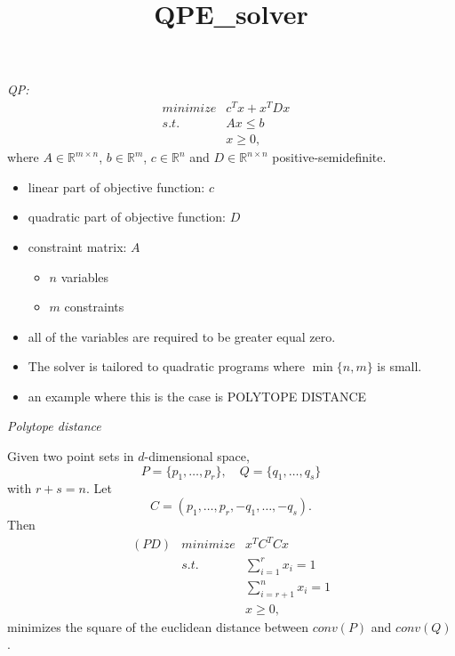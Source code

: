 \documentclass{slides}
\title{QPE\_solver}
\author{}
\newcommand{\R}{\ensuremath{\mathbb{R}}}
\begin{document}
\maketitle
\begin{slide}
\emph{QP:}
\begin{eqnarray*}
minimize & c^{T}x+x^{T}Dx & \\
s.t.     & Ax \leq b & \\
         & x \geq 0 ,&
\end{eqnarray*}
where
$A \in \R^{m \times n}$, $b \in \R^{m}$, $c \in \R^{n}$ and $D \in \R^{n
\times n}$ positive-semidefinite.


\end{slide}

\begin{note}
\begin{itemize}
\item linear part of objective function: $c$
\item quadratic part of objective function: $D$
\item constraint matrix: $A$
\begin{itemize}
\item $n$ variables
\item $m$ constraints
\end{itemize}
\item all of the variables are required to be greater equal zero.
\item The solver is tailored to quadratic programs where
$\min\{n,m\}$ is small.
\item an example where this is the case is POLYTOPE DISTANCE
\end{itemize}
\end{note}

\begin{slide}
\emph{Polytope distance}

Given two point sets in $d$-dimensional space,
\[
P=\{p_{1}, \ldots, p_{r} \},
\quad
Q=\{q_{1}, \ldots, q_{s} \}
\]
with $r+s=n$. Let
\[
C=(p_{1}, \ldots , p_{r}, -q_{1}, \ldots, -q_{s}).
\]
Then 
\begin{eqnarray*}
(PD) & minimize & x^{T}C^{T}Cx  \\
     & s.t.     & \sum_{i=1}^{r}x_{i} = 1 \\
     &          & \sum_{i=r+1}^{n}x_{i} = 1 \\
     &          & x \geq 0,
\end{eqnarray*}
minimizes the square of the euclidean distance between $conv(P)$ and $conv(Q)$.
\end{slide}
\end{document}
